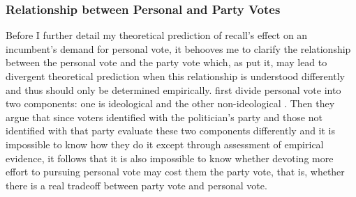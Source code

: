 \documentclass[hyphens, crop=false]{standalone}
\begin{document}
		\subsubsection*{Relationship between Personal and Party Votes}
		
		
		Before I further detail my theoretical prediction of recall's effect on an incumbent's demand for personal vote,
		it behooves me to clarify the relationship between the personal vote and the party vote which,
		as
		\citeauthor{carseyRethinkingNormalVote2017}
		\autocite*{carseyRethinkingNormalVote2017}
		put it,
		may lead to divergent theoretical prediction when this relationship is understood differently and thus should only be determined empirically.
		\citeauthor{carseyRethinkingNormalVote2017}
		\autocite*{carseyRethinkingNormalVote2017}
		first divide personal vote into two components:
		one is ideological and the other non-ideological 
		\autocite*[467-468]{carseyRethinkingNormalVote2017}.
		Then they argue that since voters identified with the politician's party and those not identified with that party evaluate these two components differently
		and it is impossible to know how they do it except through assessment of empirical evidence,
		it follows that it is also impossible to know whether devoting more effort to pursuing personal vote may cost them the party vote,
		that is,
		whether there is a real tradeoff between party vote and personal vote.
		
\end{document}
